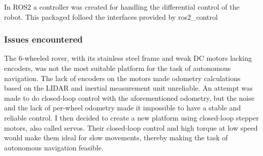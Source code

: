 \documentclass[11pt]{article}
\begin{document}
        In ROS2 a controller was created for handling the differential control of the robot. This packaged folloed the interfaces provided by ros2\_control
        

        \subsubsection{Issues encountered}
            

        The 6-wheeled rover, with its stainless steel frame and weak DC motors lacking encoders, was not the most suitable platform for the task of autonomous navigation. The lack of encoders on the motors made odometry calculations based on the LIDAR and inertial measurement unit unreliable. An attempt was made to do closed-loop control with the aforementioned odometry, but the noise and the lack of per-wheel odometry made it impossible to have a stable and reliable control. I then decided to create a new platform using closed-loop stepper motors, also called servos. Their closed-loop control and high torque at low speed would make them ideal for slow movements, thereby making the task of autonomous navigation feasible.
\end{document}

